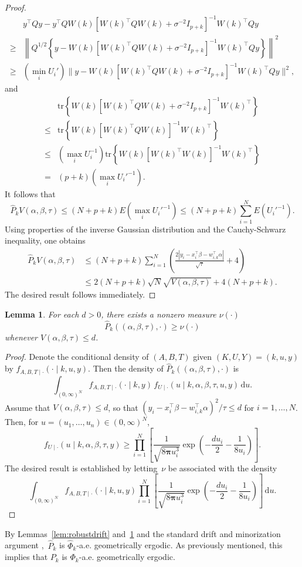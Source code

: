 \documentclass[12pt]{article}
\newcommand{\df}{\mathrm{d}}
\newtheorem{lemma}[theorem]{Lemma}
\begin{document}
\begin{proof}
\[\begin{aligned}
		&y^{\top} Q y - y^{\top} Q W(k) [W(k)^{\top} Q W(k) + \sigma^{-2} I_{p+k}]^{-1} W(k)^{\top} Q y \\
		\geq & \left\|Q^{1/2} \left\{ y -  W(k) [W(k)^{\top} Q W(k) + \sigma^{-2} I_{p+k} ]^{-1} W(k)^{\top} Q y \right\} \right\|^2 \\
		\geq & \left(\min_i U_i' \right) \| y -  W(k) [W(k)^{\top} Q W(k) + \sigma^{-2} I_{p+k} ]^{-1} W(k)^{\top} Q y \|^2,
	\end{aligned}
	\]
	and
	\[
	\begin{aligned}
		&\mbox{tr} \left\{ W(k) [W(k)^{\top} Q W(k) + \sigma^{-2} I_{p+k} ]^{-1} W(k)^{\top} \right\} \\
		\leq & \mbox{tr} \left\{  W(k) [W(k)^{\top} Q W(k) ]^{-1} W(k)^{\top}  \right\} \\
		\leq & \left( \max_i U_i^{-1} \right) \mbox{tr} \left\{   W(k) [W(k)^{\top} W(k) ]^{-1} W(k)^{\top}  \right\} \\
		=& (p+k) \left( \max_i U_i'^{-1} \right).
	\end{aligned}
	\]
	It follows that
	\[
	\hat{P}_k V(\alpha, \beta, \tau) \leq (N+p+k) E \left( \max_i U_i'^{-1} \right) \leq (N+p+k) \sum_{i=1}^N E(U_i'^{-1}).
	\]
	Using properties of the inverse Gaussian distribution and the Cauchy-Schwarz inequality, one obtains
	\[
	\begin{aligned}
		\hat{P}_k V(\alpha, \beta, \tau) &\leq  (N+p+k) \sum_{i=1}^N \left( \frac{2 |y_i - x_i^{\top} \beta - w_{i,k}^{\top} \alpha|}{\sqrt{\tau}} + 4 \right) \\
		&\leq 2 (N+p+k) \sqrt{N} \sqrt{V(\alpha,\beta,\tau)} + 4(N+p+k).
	\end{aligned}
	\]
	The desired result follows immediately.
\end{proof}

\begin{lemma} \label{lem:robustminor}
	For each $d > 0$, there exists a nonzero measure $\nu(\cdot)$
	\[
	\hat{P}_k((\alpha, \beta, \tau), \cdot) \geq \nu(\cdot)
	\]
	whenever $V(\alpha, \beta, \tau) \leq d$.
\end{lemma}
\begin{proof}
	Denote the conditional density of $(A,B,T)$ given $(K,U,Y) = (k,u,y)$ by $f_{A,B,T \mid \cdot}(\cdot \mid k,u,y)$.
	Then the density of $\hat{P}_k((\alpha,\beta,\tau), \cdot)$ is
	\[
	\int_{(0,\infty)^N} f_{A,B,T \mid \cdot}(\cdot \mid k,y) \, f_{U \mid \cdot}(u \mid k, \alpha, \beta, \tau, u, y) \, \df u.
	\]
	Assume that $V(\alpha, \beta, \tau) \leq d$, so that $(y_i - x_i^{\top} \beta - w_{i,k}^{\top} \alpha)^2/\tau \leq d$ for $i = 1,\dots,N$.
	Then, for $u = (u_1, \dots, u_n) \in (0,\infty)^N$,
	\[
	f_{U \mid \cdot}(u \mid k, \alpha, \beta, \tau, y) \geq \prod_{i=1}^N \left[ \frac{1}{\sqrt{8\bm{\pi} u_i^3}} \exp \left( - \frac{du_i}{2} - \frac{1}{8 u_i}  \right) \right].
	\]
	The desired result is established by letting~$\nu$ be associated with the density
	\[
	\int_{(0,\infty)^N} f_{A,B,T \mid \cdot}(\cdot \mid k,u,y) \prod_{i=1}^N \left[ \frac{1}{\sqrt{8\bm{\pi} u_i^3}} \exp \left( - \frac{du_i}{2} - \frac{1}{8 u_i}  \right) \right] \, \df u.
	\]
\end{proof}

By Lemmas~\ref{lem:robustdrift} and~\ref{lem:robustminor} and the standard drift and minorization argument \citep{rosenthal1995minorization},~$\hat{P}_k$ is $\hat{\Phi}_k$-a.e. geometrically ergodic.
As previously mentioned, this implies that $P_k$ is $\Phi_k$-a.e. geometrically ergodic.
\end{document}
